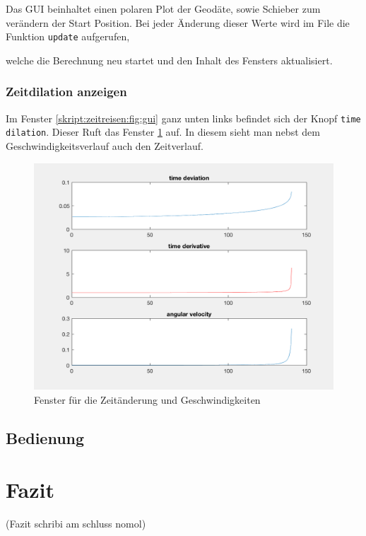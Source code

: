 \begin{refsection}
    Das GUI beinhaltet einen polaren Plot der Geodäte, sowie Schieber zum verändern der Start Position. Bei jeder Änderung dieser Werte wird im  File die Funktion \texttt{update} aufgerufen, 
      
    welche die Berechnung neu startet und den Inhalt des Fensters aktualisiert.
    
    \subsubsection{Zeitdilation anzeigen}
    Im Fenster \ref{skript:zeitreisen:fig:gui} ganz unten links befindet sich der Knopf \texttt{time dilation}. Dieser Ruft das Fenster \ref{skript:zeitreisen:fig:time} auf. In diesem sieht man nebst dem Geschwindigkeitsverlauf auch den Zeitverlauf.
      \begin{figure}[H]
        \centering
        \includegraphics[width=12cm]{zeitreisen/time.png}
        \caption{Fenster für die Zeitänderung und Geschwindigkeiten}
        \label{skript:zeitreisen:fig:time} 
    \end{figure}
    
    
    
    \subsection{Bedienung}
    

	\section{Fazit}
    (Fazit schribi am schluss nomol)
    

\end{refsection}
